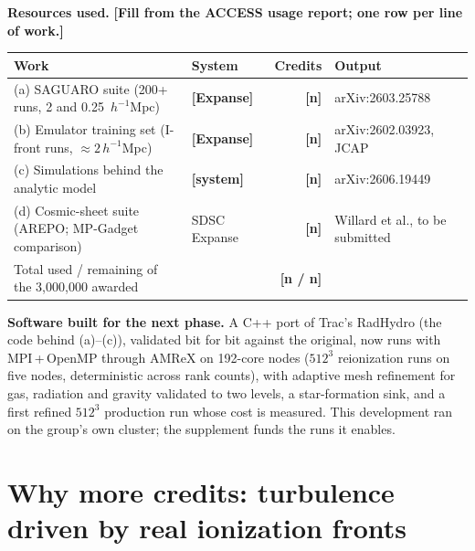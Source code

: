\documentclass[11pt]{article}
\newcommand{\todo}[1]{\textbf{[#1]}}
\begin{document}
\textbf{Resources used.} \todo{Fill from the ACCESS usage report; one row per line of work.}
\begin{center}\small
\begin{tabular}{llrl}
\toprule
Work & System & Credits & Output \\
\midrule
(a) SAGUARO suite (200+ runs, 2 and 0.25~$h^{-1}$Mpc) & \todo{Expanse} & \todo{n} & arXiv:2603.25788 \\
(b) Emulator training set (I-front runs, $\approx 2\,h^{-1}$Mpc) & \todo{Expanse} & \todo{n} & arXiv:2602.03923, JCAP \\
(c) Simulations behind the analytic model & \todo{system} & \todo{n} & arXiv:2606.19449 \\
(d) Cosmic-sheet suite (AREPO; MP-Gadget comparison) & SDSC Expanse & \todo{n} & Willard et al., to be submitted \\
\midrule
Total used / remaining of the 3{,}000{,}000 awarded & & \todo{n / n} & \\
\bottomrule
\end{tabular}
\end{center}

\textbf{Software built for the next phase.} A C++ port of Trac's RadHydro (the
code behind (a)--(c)), validated bit for bit against the original, now runs
with MPI\,+\,OpenMP through AMReX on 192-core nodes ($512^3$ reionization runs
on five nodes, deterministic across rank counts), with adaptive mesh refinement
for gas, radiation and gravity validated to two levels, a star-formation sink,
and a first refined $512^3$ production run whose cost is measured. This
development ran on the group's own cluster; the supplement funds the runs it
enables.

\section{Why more credits: turbulence driven by real ionization fronts}
\end{document}
